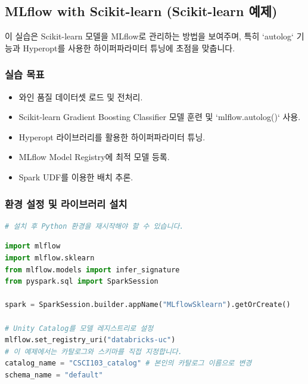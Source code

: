 \documentclass[11pt,a4paper]{article}
\begin{document}
\newpage
\subsection*{MLflow with Scikit-learn (Scikit-learn 예제)}
이 실습은 Scikit-learn 모델을 MLflow로 관리하는 방법을 보여주며, 특히 `autolog` 기능과 Hyperopt를 사용한 하이퍼파라미터 튜닝에 초점을 맞춥니다.

\subsubsection*{실습 목표}
\begin{itemize}
    \item 와인 품질 데이터셋 로드 및 전처리.
    \item Scikit-learn Gradient Boosting Classifier 모델 훈련 및 `mlflow.autolog()` 사용.
    \item Hyperopt 라이브러리를 활용한 하이퍼파라미터 튜닝.
    \item MLflow Model Registry에 최적 모델 등록.
    \item Spark UDF를 이용한 배치 추론.
\end{itemize}

\subsubsection*{환경 설정 및 라이브러리 설치}
\begin{lstlisting}[language=Python, caption={라이브러리 설치 및 Python 재시작}]
%pip install mlflow scikit-learn hyperopt
# 설치 후 Python 환경을 재시작해야 할 수 있습니다.
\end{lstlisting}

\begin{lstlisting}[language=Python, caption={MLflow 및 Unity Catalog 설정}]
import mlflow
import mlflow.sklearn
from mlflow.models import infer_signature
from pyspark.sql import SparkSession

spark = SparkSession.builder.appName("MLflowSklearn").getOrCreate()

# Unity Catalog를 모델 레지스트리로 설정
mlflow.set_registry_uri("databricks-uc")
# 이 예제에서는 카탈로그와 스키마를 직접 지정합니다.
catalog_name = "CSCI103_catalog" # 본인의 카탈로그 이름으로 변경
schema_name = "default"
\end{lstlisting}
\end{document}
